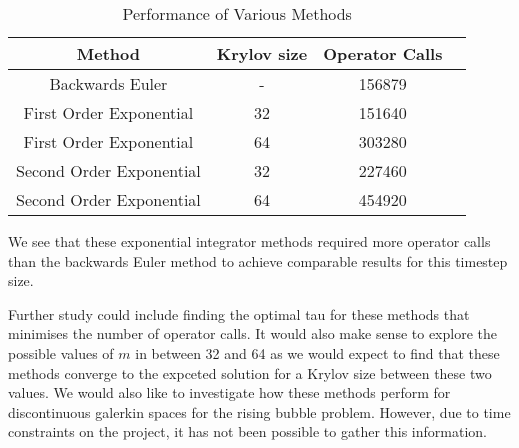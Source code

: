 \begin{table}[H]
    \centering
    \begin{tabular}{| c | c | c | c |}
    \hline
    Method & Krylov size & Operator Calls\\
    \hline
    Backwards Euler & - & 156879 \\
    First Order Exponential & 32 & 151640 \\
    First Order Exponential & 64 & 303280 \\
    Second Order Exponential & 32 & 227460 \\
    Second Order Exponential & 64 & 454920 \\
    \hline
    \end{tabular}
    \caption{Performance of Various Methods}
    \label{tab:reduced_data}
\end{table}

We see that these exponential integrator methods required more operator calls than the backwards Euler method to achieve comparable results for this timestep size.


Further study could include finding the optimal tau for these methods that minimises the number of operator calls.
It would also make sense to explore the possible values of $m$ in between 32 and 64 as we would expect to find that these methods converge to the expceted solution for a Krylov size between these two values.
We would also like to investigate how these methods perform for discontinuous galerkin spaces for the rising bubble problem.
However, due to time constraints on the project, it has not been possible to gather this information.

